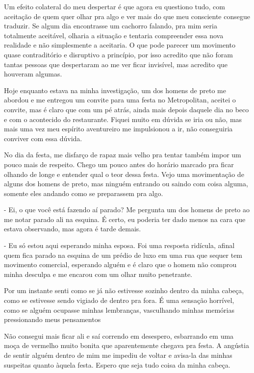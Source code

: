 Um efeito colateral do meu despertar é que agora eu questiono tudo, com aceitação de quem quer olhar pra algo e ver mais do que meu consciente consegue traduzir. Se algum dia encontrasse um cachorro falando, pra mim seria totalmente aceitável, olharia a situação e tentaria compreender essa nova realidade e não simplesmente a aceitaria. O que pode parecer um movimento quase contraditório e disruptivo a princípio, por isso acredito que não foram tantas pessoas que despertaram ao me ver ficar invisível, mas acredito que houveram algumas.

Hoje enquanto estava na minha investigação, um dos homens de preto me abordou e me entregou um convite para uma festa no Metropolitan, aceitei o convite, mas é claro que com um pé atrás, ainda mais depois daquele dia no beco e com o acontecido do restaurante. Fiquei muito em dúvida se iria ou não, mas mais uma vez meu espírito aventureiro me impulsionou a ir, não conseguiria conviver com essa dúvida.

No dia da festa, me disfarço de rapaz mais velho pra tentar também impor um pouco mais de respeito. Chego um pouco antes do horário marcado pra ficar olhando de longe e entender qual o teor dessa festa. Vejo uma movimentação de alguns dos homens de preto, mas ninguém entrando ou saindo com coisa alguma, somente eles andando como se preparassem pra algo.

- Ei, o que você está fazendo aí parado? Me pergunta um dos homens de preto ao me notar parado ali na esquina. É certo, eu poderia ter dado menos na cara que estava observando, mas agora é tarde demais.

- Eu só estou aqui esperando minha esposa. Foi uma resposta ridícula, afinal quem fica parado na esquina de um prédio de luxo em uma rua que sequer tem movimento comercial, esperando alguém e é claro que o homem não comprou minha desculpa e me encarou com um olhar muito penetrante.

Por um instante senti como se já não estivesse sozinho dentro da minha cabeça, como se estivesse sendo vigiado de dentro pra fora. É uma sensação horrível, como se alguém ocupasse minhas lembranças, vasculhando minhas memórias pressionando meus pensamentos

Não consegui mais ficar ali e saí correndo em desespero, esbarrando em uma moça de vermelho muito bonita que aparentemente chegava pra festa. A angústia de sentir alguém dentro de mim me impediu de voltar e avisa-la das minhas suspeitas quanto àquela festa. Espero que seja tudo coisa da minha cabeça.

